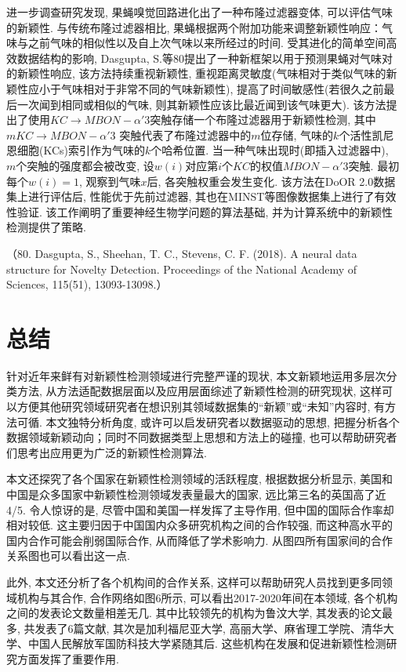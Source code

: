 \documentclass{Style/aas}
\begin{document}
\begin{multicols}{2}
  进一步调查研究发现, 果蝇嗅觉回路进化出了一种布隆过滤器变体, 可以评估气味的新颖性. 与传统布隆过滤器相比, 果蝇根据两个附加功能来调整新颖性响应：气味与之前气味的相似性以及自上次气味以来所经过的时间. 受其进化的简单空间高效数据结构的影响, Dasgupta, S.等80提出了一种新框架以用于预测果蝇对气味对的新颖性响应, 该方法持续重视新颖性, 重视距离灵敏度(气味相对于类似气味的新颖性应小于气味相对于非常不同的气味新颖性), 提高了时间敏感性(若很久之前最后一次闻到相同或相似的气味, 则其新颖性应该比最近闻到该气味更大). 该方法提出了使用$KC\rightarrow MBON-\alpha{'}3$突触存储一个布隆过滤器用于新颖性检测, 其中$mKC\rightarrow MBON-\alpha{'}3$ 突触代表了布隆过滤器中的$m$位存储, 气味的$k$个活性凯尼恩细胞(KCs)索引作为气味的$k$个哈希位置. 当一种气味出现时(即插入过滤器中), $m$个突触的强度都会被改变, 设$w\left( i \right)$对应第$i$个$KC$的权值$MBON-\alpha'3$突触. 最初每个$w\left( i \right) =1$, 观察到气味$x$后, 各突触权重会发生变化. 该方法在DoOR 2.0数据集上进行评估后, 性能优于先前过滤器, 其也在MINST等图像数据集上进行了有效性验证. 该工作阐明了重要神经生物学问题的算法基础, 并为计算系统中的新颖性检测提供了策略.

  （80.	Dasgupta, S., Sheehan, T. C., Stevens, C. F. (2018). A neural data structure for Novelty Detection. Proceedings of the National Academy of Sciences, 115(51), 13093-13098.）


  \section{总结}

  针对近年来鲜有对新颖性检测领域进行完整严谨的现状, 本文新颖地运用多层次分类方法, 从方法适配数据层面以及应用层面综述了新颖性检测的研究现状, 这样可以方便其他研究领域研究者在想识别其领域数据集的“新颖”或“未知”内容时, 有方法可循. 本文独特分析角度, 或许可以启发研究者以数据驱动的思想, 把握分析各个数据领域新颖动向；同时不同数据类型上思想和方法上的碰撞, 也可以帮助研究者们思考出应用更为广泛的新颖性检测算法.

  本文还探究了各个国家在新颖性检测领域的活跃程度, 根据数据分析显示, 美国和中国是众多国家中新颖性检测领域发表量最大的国家, 远比第三名的英国高了近4/5. 令人惊讶的是, 尽管中国和美国一样发挥了主导作用, 但中国的国际合作率却相对较低. 这主要归因于中国国内众多研究机构之间的合作较强, 而这种高水平的国内合作可能会削弱国际合作, 从而降低了学术影响力. 从图四所有国家间的合作关系图也可以看出这一点.

  此外, 本文还分析了各个机构间的合作关系, 这样可以帮助研究人员找到更多同领域机构与其合作, 合作网络如图6所示, 可以看出2017-2020年间在本领域, 各个机构之间的发表论文数量相差无几. 其中比较领先的机构为鲁汶大学, 其发表的论文最多, 共发表了6篇文献, 其次是加利福尼亚大学, 高丽大学、麻省理工学院、清华大学、中国人民解放军国防科技大学紧随其后. 这些机构在发展和促进新颖性检测研究方面发挥了重要作用.








\end{multicols}
\end{document}
